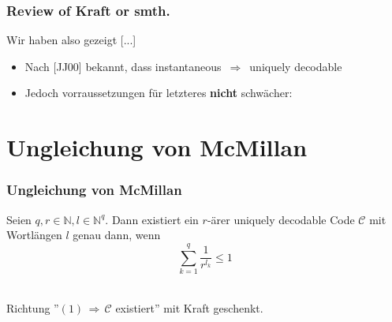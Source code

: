\documentclass{beamer}
\begin{document}
\begin{frame}[t]
{{\begin{center}
            \end{center}
        }
    }
\end{frame}

\begin{frame}
    \frametitle{Review of Kraft or smth.}

    Wir haben also gezeigt [...]

    \begin{itemize}
        \item Nach [JJ00] bekannt, dass instantaneous $\,\Longrightarrow\,$ uniquely decodable
        \item Jedoch vorraussetzungen für letzteres \textbf{nicht} schwächer:
    \end{itemize}

\end{frame}

\section{Ungleichung von McMillan}

\begin{frame}
    \frametitle{Ungleichung von McMillan}
    Seien $q,r \in \mathbb{N}, l \in \mathbb{N}^q$. Dann existiert ein $r$-ärer uniquely decodable Code $\mathcal{C}$
    mit Wortlängen $l$ genau dann, wenn
    \begin{equation}
        \sum_{k=1}^{q} \frac{1}{r^{l_k}} \leq 1
    \end{equation}\\[20pt]
    \pause

    Richtung ''$(1) \,\Longrightarrow\, \mathcal{C}$ existiert'' mit Kraft geschenkt.\\
\end{frame}
\end{document}
